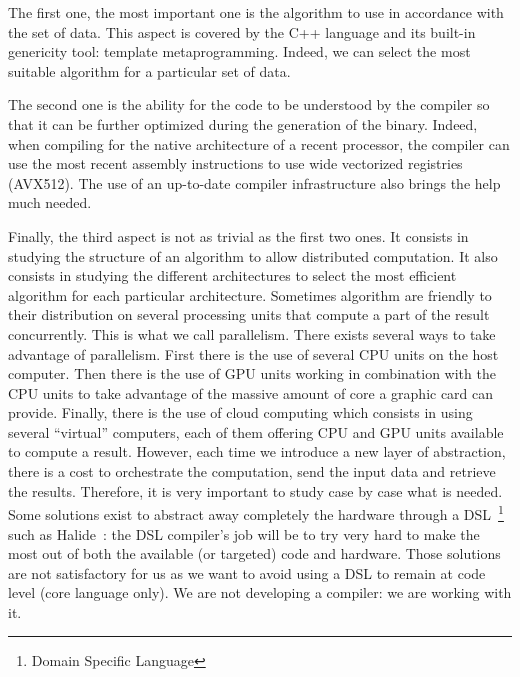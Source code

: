 The first one, the most important one is the algorithm to use in accordance with the set of data. This aspect is covered
by the C++ language and its built-in genericity tool: template metaprogramming. Indeed, we can select the most suitable
algorithm for a particular set of data.

The second one is the ability for the code to be understood by the compiler so that it can be further optimized during
the generation of the binary. Indeed, when compiling for the native architecture of a recent processor, the compiler can
use the most recent assembly instructions to use wide vectorized registries (AVX512). The use of an up-to-date compiler
infrastructure also brings the help much needed.

Finally, the third aspect is not as trivial as the first two ones. It consists in studying the structure of an algorithm
to allow distributed computation. It also consists in studying the different architectures to select the most efficient
algorithm for each particular architecture. Sometimes algorithm are friendly to their distribution on several processing
units that compute a part of the result concurrently. This is what we call parallelism. There exists several ways to
take advantage of parallelism. First there is the use of several CPU units on the host computer. Then there is the use
of GPU units working in combination with the CPU units to take advantage of the massive amount of core a graphic card
can provide. Finally, there is the use of cloud computing which consists in using several ``virtual'' computers, each of
them offering CPU and GPU units available to compute a result. However, each time we introduce a new layer of
abstraction, there is a cost to orchestrate the computation, send the input data and retrieve the results. Therefore, it
is very important to study case by case what is needed. Some solutions exist to abstract away completely the hardware
through a DSL~\footnote{Domain Specific Language} such as Halide~\parencite{ragankelley.2013.halide}: the DSL compiler's
job will be to try very hard to make the most out of both the available (or targeted) code and hardware. Those solutions
are not satisfactory for us as we want to avoid using a DSL to remain at code level (core language only). We are not
developing a compiler: we are working with it.

